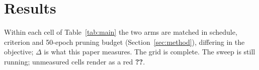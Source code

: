 \section{Results}
\label{sec:results}
\label{sec:results:ablation}

Within each cell of Table~\ref{tab:main} the two arms are matched in schedule,
criterion and 50-epoch pruning budget (Section~\ref{sec:method}),
differing in the objective; $\Delta$ is what this paper measures.
%
  {The grid is complete.}%
  {The sweep is still running; unmeasured cells render as a red \textbf{??}.}

